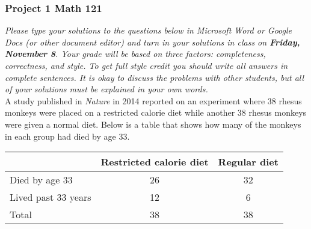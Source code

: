 \documentclass[12pt]{article}
\begin{document}
\subsubsection*{Project 1 \hfill Math 121}

\textit{Please type your solutions to the questions below in Microsoft Word or Google Docs (or other document editor) and turn in your solutions in class on \textbf{Friday, November 8}. Your grade will be based on three factors: completeness, correctness, and style. To get full style credit you should write all answers in complete sentences. It is okay to discuss the problems with other students, but all of your solutions must be explained in your own words. }  \\


A study published in \emph{Nature} in 2014 reported on an experiment where 38 rhesus monkeys were placed on a restricted calorie diet while another 38 rhesus monkeys were given a normal diet.  Below is a table that shows how many of the monkeys in each group had died by age 33.

\begin{center}
\begin{tabular}{l|c|c}
~ & Restricted calorie diet & Regular diet \\ \hline
Died by age 33 & 26 & 32 \\
Lived past 33 years & 12 & 6 \\ \hline
Total & 38 & 38
\end{tabular}
\end{center}
\end{document}
